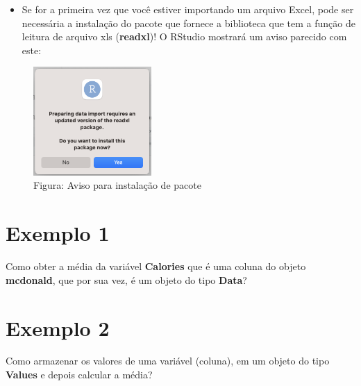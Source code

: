 \documentclass[
]{book}
\newenvironment{Shaded}{\begin{snugshade}}{\end{snugshade}}
\newcommand{\CommentTok}[1]{\textcolor[rgb]{0.56,0.35,0.01}{\textit{#1}}}
\newcommand{\FunctionTok}[1]{\textcolor[rgb]{0.13,0.29,0.53}{\textbf{#1}}}
\newcommand{\NormalTok}[1]{#1}
\newcommand{\OtherTok}[1]{\textcolor[rgb]{0.56,0.35,0.01}{#1}}
\newcommand{\SpecialCharTok}[1]{\textcolor[rgb]{0.81,0.36,0.00}{\textbf{#1}}}
\providecommand{\tightlist}{%
  \setlength{\itemsep}{0pt}\setlength{\parskip}{0pt}}
\begin{document}
\begin{itemize}
\tightlist
\item
  Se for a primeira vez que você estiver importando um arquivo Excel, pode ser necessária a instalação do pacote que fornece a biblioteca que tem a função de leitura de arquivo xls (\textbf{readxl})! O RStudio mostrará um aviso parecido com este:
\end{itemize}

\begin{figure}
\centering
\includegraphics[width=0.4\textwidth,height=\textheight]{telaImportPacote.png}
\caption{ Figura: Aviso para instalação de pacote}
\end{figure}

\section{Exemplo 1}\label{exemplo-1-1}

Como obter a média da variável \textbf{Calories} que é uma coluna do objeto \textbf{mcdonald}, que por sua vez, é um objeto do tipo \textbf{Data}?

\begin{Shaded}
\end{Shaded}

\section{Exemplo 2}\label{exemplo-2-1}

Como armazenar os valores de uma variável (coluna), em um objeto do tipo \textbf{Values} e depois calcular a média?

\begin{Shaded}
\end{Shaded}
\end{document}
